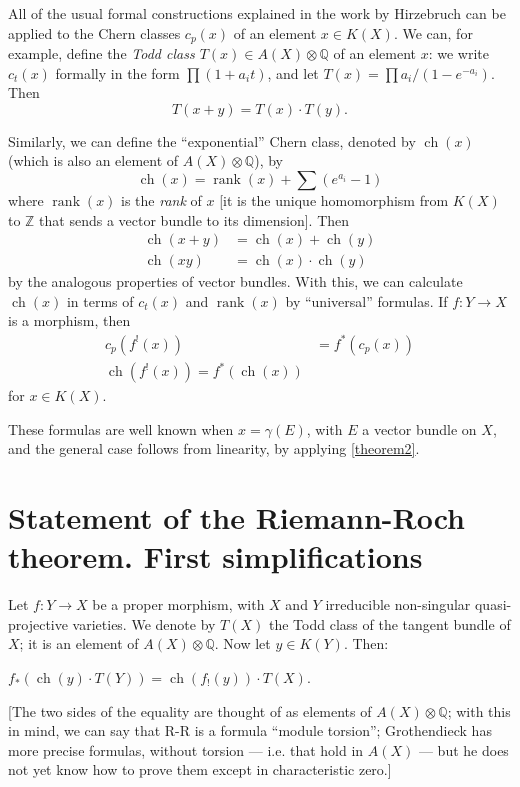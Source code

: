 \documentclass{article}
\theoremstyle{plain}
\newenvironment{theorem}[1]
    {\renewcommand\theinnercustomtheorem{#1}\innercustomtheorem}
    {\endinnercustomtheorem}
\theoremstyle{definition}
\DeclareMathOperator{\ch}{ch}
\DeclareMathOperator{\rank}{rank}
\newcommand{\oldpage}[1]{\marginpar{\footnotesize$\Big\vert$ \textit{p.~#1}}}
\begin{document}
All of the usual formal constructions explained in the work by Hirzebruch \cite{9} can be applied to the Chern classes $c_p(x)$ of an element $x\in K(X)$.
We can, for example, define the \emph{Todd class $T(x)\in A(X)\otimes\mathbb{Q}$} of an element $x$:
we write $c_t(x)$ formally in the form $\prod(1+a_it)$, and let $T(x)=\prod a_i/(1-e^{-a_i})$.
Then
\[
  T(x+y) = T(x)\cdot T(y).
\]

Similarly, we can define the ``exponential'' Chern class, denoted by $\ch(x)$ (which is also an element of $A(X)\otimes\mathbb{Q}$), by
\[
  \ch(x) = \rank(x)+\sum(e^{a_i}-1)
\]
where $\rank(x)$ is the \emph{rank} of $x$ [it is the unique homomorphism from $K(X)$ to $\mathbb{Z}$ that sends a vector bundle to its dimension].
Then
\begin{align*}
  \ch(x+y) &= \ch(x)+\ch(y)
\\\ch(xy) &= \ch(x)\cdot\ch(y)
\end{align*}
by the analogous properties of vector bundles.
With this, we can calculate $\ch(x)$ in terms of $c_t(x)$ and $\rank(x)$ by ``universal'' formulas.
If $f\colon Y\to X$ is a morphism, then
\begin{align*}
  c_p(f^!(x)) &= f^*(c_p(x))
\\\ch(f^!(x)) = f^*(\ch(x))
\end{align*}
for $x\in K(X)$.

These formulas are well known when $x=\gamma(E)$, with $E$ a vector bundle on $X$, and the general case follows from linearity, by applying \cref{theorem2}.


\section{Statement of the Riemann-Roch theorem. First simplifications}
\label{section7}

\oldpage{113}
Let $f\colon Y\to X$ be a proper morphism, with $X$ and $Y$ irreducible non-singular quasi-projective varieties.
We denote by $T(X)$ the Todd class of the tangent bundle of $X$;
it is an element of $A(X)\otimes\mathbb{Q}$.
Now let $y\in K(Y)$.
Then:

\begin{theorem}{(Riemann-Roch)}
\label{theoremriemannroch}
  $f_*(\ch(y)\cdot T(Y)) = \ch(f_!(y))\cdot T(X)$.
\end{theorem}

[The two sides of the equality are thought of as elements of $A(X)\otimes\mathbb{Q}$;
with this in mind, we can say that R-R is a formula ``module torsion'';
Grothendieck has more precise formulas, without torsion --- i.e. that hold in $A(X)$ --- but he does not yet know how to prove them except in characteristic zero.]
\end{document}
